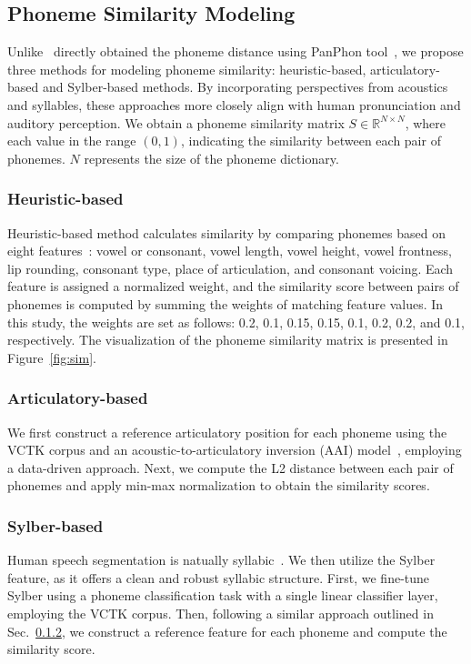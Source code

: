 \vspace{-5pt}
\subsection{Phoneme Similarity Modeling} \label{sec:phn-similarity}
Unlike~\cite{lee2025dypcl} directly obtained the phoneme distance using PanPhon tool~\cite{mortensen-etal-2016-panphon}, we propose three methods for modeling phoneme similarity: heuristic-based, articulatory-based and Sylber-based methods. By incorporating perspectives from acoustics and syllables, these approaches more closely align with human pronunciation and auditory perception. We obtain a phoneme similarity matrix $S \in \mathbb{R}^{N \times N}$, where each value in the range $(0, 1)$, indicating the similarity between each pair of phonemes. $N$ represents the size of the phoneme dictionary.



\subsubsection{Heuristic-based}
Heuristic-based method calculates similarity by comparing phonemes based on eight features~\cite{anderson2018essentials}: vowel or consonant, vowel length, vowel height, vowel frontness, lip rounding, consonant type, place of articulation, and consonant voicing. Each feature is assigned a normalized weight, and the similarity score between pairs of phonemes is computed by summing the weights of matching feature values. In this study, the weights are set as follows: 0.2, 0.1, 0.15, 0.15, 0.1, 0.2, 0.2, and 0.1, respectively. The visualization of the phoneme similarity matrix is presented in Figure~\ref{fig:sim}.


\subsubsection{Articulatory-based} \label{sec:art-based}
We first construct a reference articulatory position for each phoneme using the VCTK corpus and an acoustic-to-articulatory inversion (AAI) model~\cite{cho2024jstsp}, employing a data-driven approach. Next, we compute the L2 distance between each pair of phonemes and apply min-max normalization to obtain the similarity scores.

\subsubsection{Sylber-based}
Human speech segmentation is natually syllabic~\cite{cho2024sylber}. We then utilize the Sylber~\cite{cho2024sylber} feature, as it offers a clean and robust syllabic structure. First, we fine-tune Sylber using a phoneme classification task with a single linear classifier layer, employing the VCTK corpus. Then, following a similar approach outlined in Sec.~\ref{sec:art-based}, we construct a reference feature for each phoneme and compute the similarity score.

